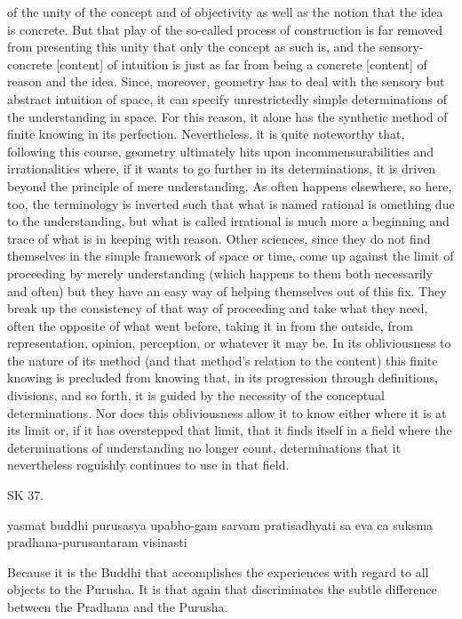     of the unity of the concept and of objectivity as well as
    the notion that the idea is concrete.
    But that play of the so-called process of construction is far
    removed from presenting this unity that only the concept as such is,
    and the sensory-concrete [content] of intuition is just as far from
    being a concrete [content] of reason and the idea.
    Since, moreover, geometry has to deal with the sensory but abstract
    intuition of space, it can specify unrestrictedly simple determinations
    of the understanding in space.
    For this reason, it alone has the
    synthetic method of finite knowing in its perfection.
    Nevertheless, it is quite noteworthy that, following this course, geometry ultimately
    hits upon incommensurabilities and irrationalities where, if it wants
    to go further in its determinations, it is driven beyond the principle
    of mere understanding.
    As often happens elsewhere, so here, too,
    the terminology is inverted such that what is named rational is
    omething due to the understanding,
    but what is called irrational is much more a beginning and trace of what is in keeping
    with reason.
    Other sciences, since they do not find themselves in the simple framework
    of space or time, come up against the limit of proceeding by merely understanding
    (which happens to them both necessarily and often)
    but they have an easy way of helping themselves out of this fix.
    They break up the consistency of that way of proceeding and take what they need, often
    the opposite of what went before, taking it in from the outside, from
    representation, opinion, perception, or whatever it may be.
    In its obliviousness to the nature of its method
    (and that method's relation to the content)
    this finite knowing is precluded from knowing that,
    in its progression through definitions, divisions, and so forth,
    it is guided by the necessity of the conceptual determinations.
    Nor does this obliviousness allow it to know either where it is at its limit or,
    if it has overstepped that limit, that it finds itself in a field where the
    determinations of understanding no longer count,
    determinations that it nevertheless roguishly continues to use in that field.

SK 37.

yasmat buddhi purusasya upabho-gam sarvam pratisadhyati
sa eva ca suksma pradhana-purusantaram visinasti

Because it is the Buddhi that accomplishes the experiences
with regard to all objects to the Purusha.
It is that again that discriminates the subtle difference
between the Pradhana and the Purusha.

